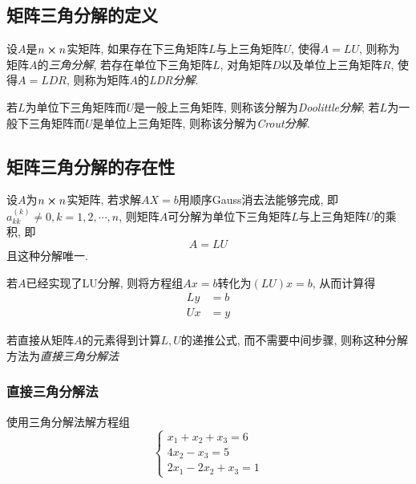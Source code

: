 \subsection{矩阵三角分解的定义}
\begin{definition}
    设$A$是$n\cross n$实矩阵, 如果存在下三角矩阵$L$与上三角矩阵$U$, 使得$A=LU$, 则称为矩阵$A$的\emph{三角分解}, 若存在单位下三角矩阵$L$, 对角矩阵$D$以及单位上三角矩阵$R$, 使得$A=LDR$, 则称为矩阵$A$的\emph{LDR分解}.
\end{definition}

若$L$为单位下三角矩阵而$U$是一般上三角矩阵, 则称该分解为\emph{Doolittle分解}; 若$L$为一般下三角矩阵而$U$是单位上三角矩阵, 则称该分解为\emph{Crout分解}.

\subsection{矩阵三角分解的存在性}

\begin{theorem}
    设$A$为$n\cross n$实矩阵, 若求解$AX=b$用顺序Gauss消去法能够完成, 即$a_{kk}^{(k)}\ne 0, k=1,2,\cdots,n$, 则矩阵$A$可分解为单位下三角矩阵$L$与上三角矩阵$U$的乘积, 即
    \begin{equation*}
        A=LU
    \end{equation*}
    且这种分解唯一.
\end{theorem}

若$A$已经实现了LU分解, 则将方程组$Ax=b$转化为$(LU)x=b$, 从而计算得
\begin{align*}
    Ly&=b\\
    Ux&=y
\end{align*}

若直接从矩阵$A$的元素得到计算$L,U$的递推公式, 而不需要中间步骤, 则称这种分解方法为\emph{直接三角分解法}

\subsubsection{直接三角分解法}
\begin{example}
    使用三角分解法解方程组
    \begin{equation*}
        \begin{cases}
            x_1+x_2+x_3=6\\
            4x_2-x_3=5\\
            2x_1-2x_2+x_3=1
        \end{cases}
    \end{equation*}
\end{example}

